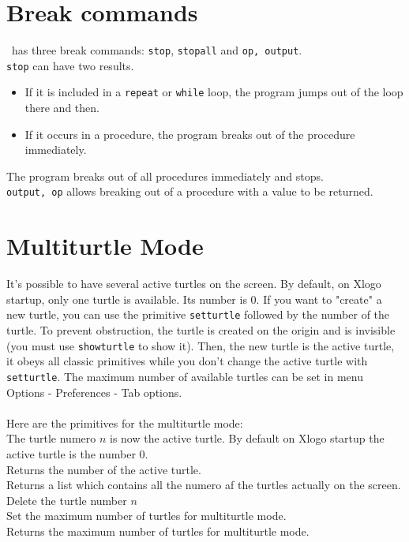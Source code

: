 \section{Break commands}
\xlogo\ has three break commands: \texttt{stop}, \texttt{stopall} and \texttt{op, output}.\\
\texttt{stop} can have two results. 
\begin{itemize}
 \item If it is included in a \texttt{repeat} or \texttt{while} loop, the program jumps out of the loop there and then.
 \item  If it occurs in a procedure, the program breaks out of the procedure immediately.
\end{itemize}
\noindent {} 
The program breaks out of all procedures immediately and stops.\\
\texttt{output, op} allows breaking out of a procedure with a value to be returned.
\section{Multiturtle Mode}
It's possible to have several active turtles on the screen. By default, on Xlogo startup, only one turtle is available. Its number is 0. If you want to "create" a new turtle, you can use the primitive \texttt{setturtle} followed by the number of the turtle. To prevent obstruction, the turtle is created on the origin and is invisible (you must use \texttt{showturtle} to show it). Then, the new turtle is the active turtle, it obeys all classic primitives while you don't change the active turtle with \texttt{setturtle}. The maximum number of available turtles can be set in menu Options - Preferences - Tab options.\\
\\
Here are the primitives for the multiturtle mode:\\
The turtle numero $n$ is now the active turtle. By default on Xlogo startup the active turtle is the number 0.\\
Returns the number of the active turtle. \\
Returns a list which contains all the numero af the turtles actually on the screen. \\
Delete the turtle number $n$\\
Set the maximum number of turtles for multiturtle mode.\\
Returns the maximum number of turtles for multiturtle mode.
